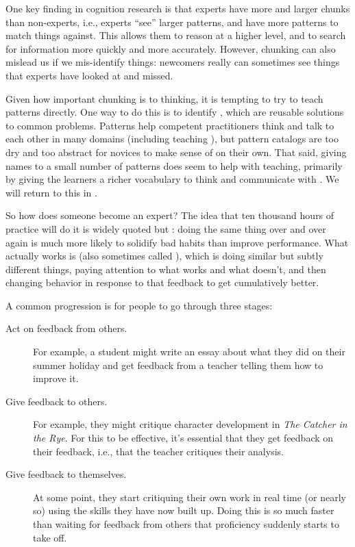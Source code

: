 One key finding in cognition research is that experts have more and
larger chunks than non-experts, i.e., experts ``see'' larger patterns, and
have more patterns to match things against. This allows them to reason
at a higher level, and to search for information more quickly and more
accurately. However, chunking can also mislead us if we mis-identify
things: newcomers really can sometimes see things that experts have
looked at and missed.

Given how important chunking is to thinking, it is tempting to try to
teach patterns directly. One way to do this is to identify , which are reusable solutions to common
problems. Patterns help competent practitioners think and talk to each
other in many domains (including teaching \cite{Berg2012}), but
pattern catalogs are too dry and too abstract for novices to make
sense of on their own. That said, giving names to a small number of
patterns does seem to help with teaching, primarily by giving the
learners a richer vocabulary to think and communicate with
\cite{Kuit2004,Byck2005,Saja2006}. We will
return to this in .


So how does someone become an expert? The idea that ten thousand hours
of practice will do it is widely quoted but : doing the same thing over and over again is
much more likely to solidify bad habits than improve performance. What
actually works is  (also
sometimes called ), which
is doing similar but subtly different things, paying attention to what
works and what doesn't, and then changing behavior in response to that
feedback to get cumulatively better.

A common progression is for people to go through three stages:

\begin{description}
\item[Act on feedback from others.]
For example, a student might write an essay about what they did on
their summer holiday and get feedback from a teacher telling them
how to improve it.
\item[Give feedback to others.]
For example, they might critique character development in \emph{The
Catcher in the Rye}. For this to be effective, it's essential that
they get feedback on their feedback, i.e., that the teacher critiques
their analysis.
\item[Give feedback to themselves.]
At some point, they start critiquing their own work in real time (or
nearly so) using the skills they have now built up. Doing this is so
much faster than waiting for feedback from others that proficiency
suddenly starts to take off.
\end{description}

